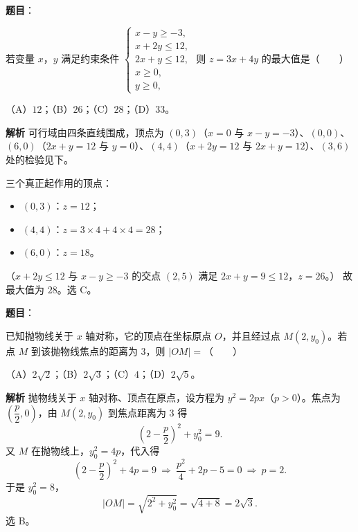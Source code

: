 \begin{answer}

\textbf{题目}：

若变量 $x$，$y$ 满足约束条件 $\begin{cases}x-y\geqslant-3,\\x+2y\leqslant12,\\2x+y\leqslant12,\\x\geqslant0,\\y\geqslant0,\end{cases}$ 则 $z=3x+4y$ 的最大值是\mbox{（　　）}

（A）$12$；（B）$26$；（C）$28$；（D）$33$。

\textbf{解析}
可行域由四条直线围成，顶点为 $(0,3)$（$x=0$ 与 $x-y=-3$）、$(0,0)$、$(6,0)$（$2x+y=12$ 与 $y=0$）、$(4,4)$（$x+2y=12$ 与 $2x+y=12$）、$(3,6)$ 处的检验见下。

三个真正起作用的顶点：
\begin{itemize}
\item $(0,3)$：$z=12$；
\item $(4,4)$：$z=3\times4+4\times4=28$；
\item $(6,0)$：$z=18$。
\end{itemize}
（$x+2y\leqslant12$ 与 $x-y\geqslant-3$ 的交点 $(2,5)$ 满足 $2x+y=9\leqslant12$，$z=26$。）
故最大值为 $28$。选 C。


\end{answer}
\begin{answer}

\textbf{题目}：

已知抛物线关于 $x$ 轴对称，它的顶点在坐标原点 $O$，并且经过点 $M(2,y_0)$。若点 $M$ 到该抛物线焦点的距离为 $3$，则 $|OM|=$\mbox{（　　）}

（A）$2\sqrt2$；（B）$2\sqrt3$；（C）$4$；（D）$2\sqrt5$。

\textbf{解析}
抛物线关于 $x$ 轴对称、顶点在原点，设方程为 $y^2=2px$（$p>0$）。焦点为 $\left(\dfrac p2,0\right)$，由 $M(2,y_0)$ 到焦点距离为 $3$ 得
\nopagebreak[4]
\[\left(2-\frac p2\right)^2+y_0^2=9.\]
又 $M$ 在抛物线上，$y_0^2=4p$，代入得
\nopagebreak[4]
\[\left(2-\frac p2\right)^2+4p=9\ \Rightarrow\ \frac{p^2}4+2p-5=0\ \Rightarrow\ p=2.\]
于是 $y_0^2=8$，
\nopagebreak[4]
\[|OM|=\sqrt{2^2+y_0^2}=\sqrt{4+8}=2\sqrt3.\]
选 B。


\end{answer}
